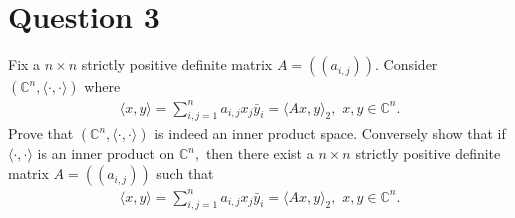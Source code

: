 \section{Question 3}
\horz
Fix a $n\times n$ strictly positive definite matrix $A= (\!\!( a_{i,j})\!\!).$ Consider $(\mathbb C^n, \langle \cdot, \cdot \rangle)$ where 
\begin{align*}
\langle x, y \rangle = \sum\limits_{i,j=1}^n a_{i,j}x_j \bar{y}_i = \langle Ax,y\rangle_2,\,\,x,y\in \mathbb C^n.
\end{align*}
Prove that  $(\mathbb C^n, \langle \cdot, \cdot \rangle)$ is indeed an inner product space. Conversely show that if $\langle \cdot, \cdot \rangle$ is an inner product on $\mathbb C^n,$ then there exist a $n\times n$ strictly  positive definite matrix $A= (\!\!( a_{i,j})\!\!)$ such that \begin{align*}
\langle x, y \rangle = \sum\limits_{i,j=1}^n a_{i,j}x_j \bar{y}_i = \langle Ax,y\rangle_2,\,\,x,y\in \mathbb C^n.
\end{align*}
\horz
